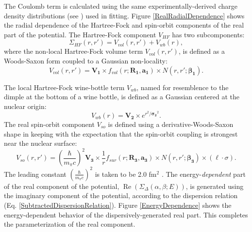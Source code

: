The Coulomb term is calculated using the same experimentally-derived charge
density distributions (see \cite{DeVries1987}) used in fitting.
Figure \ref{RealRadialDependence} shows the radial dependence of the
Hartree-Fock and spin-orbit
components of the real part of the potential.
The Hartree-Fock component $V_{HF}$ has two subcomponents:
\begin{equation} \label{HFWBEquation}
    \Sigma_{HF}(r,r') = V_{vol}(r,r') + V_{wb}(r),
\end{equation}
where the non-local Hartree-Fock volume term $V_{vol}(r,r')$, is defined as
a Woods-Saxon form coupled to a Gaussian non-locality:
\begin{equation} \label{RealVolume}
    V_{vol}(r,r') = \bm{V_{1}}{\times}f_{vol}(r; \bm{R_{1}}, \bm{a_{1}})
    {\times}N(r,r';\bm{\beta_{1}}).
\end{equation}

The local Hartree-Fock wine-bottle
term $V_{wb}$, named for resemblence to the dimple at the bottom of a wine
bottle, is defined as a Gaussian centered at the nuclear origin:
\begin{equation}
    V_{wb}(r) = \bm{V_{2}}{\times}e^{r^{2}/\bm{\sigma_{2}}^{2}}.
\end{equation}
The real spin-orbit component $V_{so}$
is defined using a derivative-Woods-Saxon shape in keeping with the
expectation that the spin-orbit coupling is strongest near the
nuclear surface:
\begin{equation} \label{RealSOEquation}
    V_{so}(r,r') = \left(\frac{\hbar}{m_{\pi}c}\right)^{2}
    \bm{V_{3}}\times\frac{1}{r}f_{sur}(r;\bm{R_{3}}, \bm{a_{3}}){\times}N(r,r';\bm{\beta_{3}})
    {\times}(\ell\cdot\sigma).
\end{equation}
The leading constant $\left(\frac{\hbar}{m_{\pi}c}\right)^{2}$ is taken to be 2.0 fm$^{2}$
\cite{MahzoonPhDThesis}.
The energy-\textit{dependent} part of the real component of the potential,
$\operatorname{Re}(\Sigma_{\Delta}(\alpha,\beta;E))$, is generated
using the imaginary component of the potential, according to the dispersion relation (Eq.
\ref{SubtractedDispersionRelation}). Figure \ref{EnergyDependence} shows the
energy-dependent behavior of the dispersively-generated real part.
This completes the parameterization of the real component.

